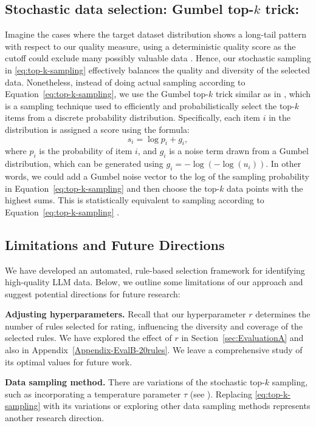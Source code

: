 \documentclass{article}
\begin{document}
\subsection{Stochastic data selection: Gumbel top-$k$ trick:}
Imagine the cases where the target dataset distribution shows a long-tail pattern with respect to our quality measure, using a deterministic quality score as the cutoff could exclude many possibly valuable data \citep{albalak2024survey}. Hence, our stochastic sampling in \ref{eq:top-k-sampling} effectively balances the quality and diversity of the selected data. Nonetheless, instead of doing actual sampling according to Equation~\ref{eq:top-k-sampling}, we use the Gumbel top-$k$ trick similar as in \citep{wettig2024qurating}, which is a sampling technique used to efficiently and probabilistically select the top-$k$ items from a discrete probability distribution. Specifically, each item $i$ in the distribution is assigned a score using the formula:
\[
s_i = \log p_i + g_i,
\]
where $p_i$  is the probability of item $i$, and $g_i$ is a noise term drawn from a Gumbel distribution, which can be generated using $g_i = -\log(-\log(u_i))$. In other words, we could add a Gumbel noise vector to the log of the sampling probability in Equation~\ref{eq:top-k-sampling} and then choose the top-$k$ data points with the highest sums. This is statistically equivalent to sampling according to Equation~\ref{eq:top-k-sampling}  \citep{kool2019stochastic}.



\subsection{Limitations and Future Directions}\label{subsec:Limitation-FutureDirecetion}
We have developed an automated, rule-based selection framework for identifying high-quality LLM data. Below, we outline some limitations of our approach and suggest potential directions for future research:

\textbf{Adjusting hyperparameters.} Recall that our hyperparameter $r$ determines the number of rules selected for rating, influencing the diversity and coverage of the selected rules. We have explored the effect of $r$ in Section~\ref{sec:EvaluationA} and also in Appendix~\ref{Appendix-EvalB-20rules}. We leave a comprehensive study of its optimal values for future work.

\textbf{Data sampling method.}
There are variations of the stochastic top-$k$ sampling, such as incorporating a temperature parameter $\tau$ (see \citet{wettig2024qurating}). Replacing \eqref{eq:top-k-sampling} with its variations or exploring other data sampling methods represents another research direction.
    
\end{document}
